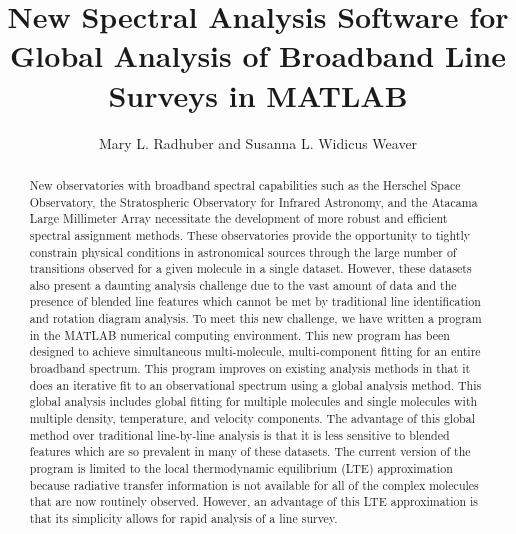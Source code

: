 
\resetcounters




\title{New Spectral Analysis Software for Global Analysis of Broadband Line Surveys in MATLAB}
\author{Mary L. Radhuber and Susanna L. Widicus Weaver
}


\begin{abstract}
New observatories with broadband spectral capabilities such as the Herschel Space Observatory, the Stratospheric Observatory for Infrared Astronomy, and the Atacama Large Millimeter Array necessitate the development of more robust and efficient spectral assignment methods.  These observatories provide the opportunity to tightly constrain physical conditions in astronomical sources through the large number of transitions observed for a given molecule in a single dataset.  However, these datasets also present a daunting analysis challenge due to the vast amount of data and the presence of blended line features which cannot be met by traditional line identification and rotation diagram analysis.  To meet this new challenge, we have written a program in the MATLAB numerical computing environment.  This new program has been designed to achieve simultaneous multi-molecule, multi-component fitting for an entire broadband spectrum.  This program improves on existing analysis methods in that it does an iterative fit to an observational spectrum using a global analysis method.  This global analysis includes global fitting for multiple molecules and single molecules with multiple density, temperature, and velocity components.  The advantage of this global method over traditional line-by-line analysis is that it is less sensitive to blended features which are so prevalent in many of these datasets.  The current version of the program is limited to the local thermodynamic equilibrium (LTE) approximation because radiative transfer information is not available for all of the complex molecules that are now routinely observed.  However, an advantage of this LTE approximation is that its simplicity allows for rapid analysis of a line survey.
\end{abstract}


